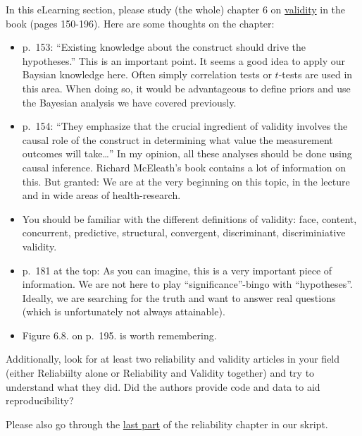 \documentclass[
]{article}
\providecommand{\tightlist}{%
  \setlength{\itemsep}{0pt}\setlength{\parskip}{0pt}}
\begin{document}
In this eLearning section, please study (the whole) chapter 6 on
\href{https://en.wikipedia.org/wiki/Validity_(statistics)}{validity} in the book (pages 150-196).
Here are some thoughts on the chapter:

\begin{itemize}
\tightlist
\item
  p.~153: ``Existing knowledge about the construct should drive the hypotheses.''
  This is an important point. It seems a good idea to apply our Baysian knowledge
  here. Often simply correlation tests or \(t\)-tests are used in this area.
  When doing so, it would be advantageous to define priors and use the Bayesian
  analysis we have covered previously.
\item
  p.~154: ``They emphasize that the crucial ingredient of validity involves the
  causal role of the construct in determining what value the measurement
  outcomes will take\ldots{}'' In my opinion, all these analyses should be done using
  causal inference. Richard McEleath's book contains a lot of information on this.
  But granted: We are at the very beginning on this topic, in the lecture and in wide
  areas of health-research.
\item
  You should be familiar with the different definitions of validity:
  face, content, concurrent, predictive, structural, convergent, discriminant,
  discriminiative validity.
\item
  p.~181 at the top: As you can imagine, this is a very important piece of information.
  We are not here to play ``significance''-bingo with ``hypotheses''. Ideally,
  we are searching for the truth and want to answer real questions
  (which is unfortunately not always attainable).
\item
  Figure 6.8. on p.~195. is worth remembering.
\end{itemize}

Additionally, look for at least two reliability and validity articles in your field
(either Reliabiilty alone or Reliability and Validity together) and try to understand what
they did. Did the authors provide code and data to aid reproducibility?

Please also go through the \href{https://jdegenfellner.github.io/Script_QM3_ZHAW/reliability-and-validity.html\#example_RELStudy}{last part}
of the reliability chapter in our skript.
\end{document}
